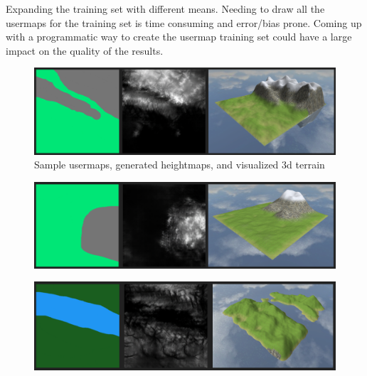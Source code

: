 \documentclass[twocolumn]{article}
\begin{document}
	Expanding the training set with different means. Needing to draw all the usermaps for the training set is time consuming and error/bias prone. Coming up with a programmatic way to create the usermap training set could have a large impact on the quality of the results.

	
	
	
	\clearpage
	
	\begin{figure}[h!]
	\caption{Sample usermaps, generated heightmaps, and visualized 3d terrain}	
	\includegraphics[width=2\columnwidth]{viz-1.png} 
	\end{figure}
	
	\begin{figure}[h!]
	\includegraphics[width=2\columnwidth]{viz-2.png} 
	\end{figure}
	
	\begin{figure}[h!]
	\includegraphics[width=2\columnwidth]{viz-3.png} 
	\end{figure}
		
  
\end{document}
